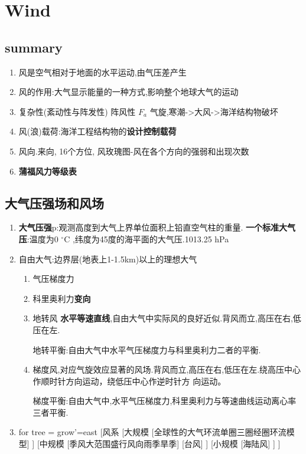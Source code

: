 \section{Wind}
	\subsection{summary}
		\begin{enumerate}[1]
			\item 风是空气相对于地面的水平运动,由气压差产生
			\item 风的作用:大气显示能量的一种方式,影响整个地球大气的运动
			\item 复杂性(紊动性与阵发性) 阵风性 $F_a$ 气旋,寒潮->大风->海洋结构物破坏
			\item 风(浪)载荷:海洋工程结构物的\textbf{设计控制载荷}
			\item 风向.来向, 16个方位, 风玫瑰图-风在各个方向的强弱和出现次数
			\item \textbf{蒲福风力等级表}
		\end{enumerate}
	
	\subsection{大气压强场和风场}
		\begin{enumerate}[1]
			\item	\textbf{大气压强}p:观测高度到大气上界单位面积上铅直空气柱的重量.
					\textbf{一个标准大气压}:温度为0 $^\circ$C ,纬度为45度的海平面的大气压.1013.25 hPa
			\item 自由大气:边界层(地表上1-1.5km)以上的理想大气
						\begin{enumerate}
							\item 气压梯度力
							\item 科里奥利力\textbf{变向}
							\item 地转风 \textbf{水平等速直线},自由大气中实际风的良好近似.背风而立,高压在右,低压在左.
							
							地转平衡:自由大气中水平气压梯度力与科里奥利力二者的平衡.
							\item 梯度风,对应气旋效应显著的风场.背风而立,高压在右,低压在左.绕高压中心作顺时针方向运动，绕低压中心作逆时针方
							向运动。
							
							梯度平衡:自由大气中,水平气压梯度力,科里奥利力与等速曲线运动离心率三者平衡.
						\end{enumerate}
			\item 
				\begin{forest}
					for tree = {grow'=east}
					[风系
						[大规模
							[全球性的大气环流{}单圈{}三圈经圈环流模型]
							]
						[中规模
							[季风{}大范围盛行风向{}雨季旱季]
							[台风]
							]
						[小规模
							[海陆风]
							]
						]
				\end{forest}
		\end{enumerate}
	
